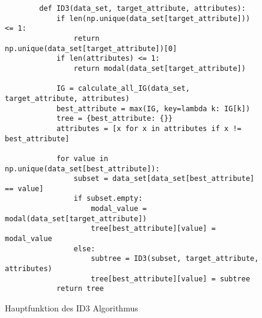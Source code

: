\begin{figure}[H]
    \centering
    \begin{verbatim}
        def ID3(data_set, target_attribute, attributes):
            if len(np.unique(data_set[target_attribute])) <= 1:
                return np.unique(data_set[target_attribute])[0]
            if len(attributes) <= 1:       
                return modal(data_set[target_attribute])

            IG = calculate_all_IG(data_set, target_attribute, attributes)
            best_attribute = max(IG, key=lambda k: IG[k])
            tree = {best_attribute: {}}
            attributes = [x for x in attributes if x != best_attribute]

            for value in np.unique(data_set[best_attribute]):
                subset = data_set[data_set[best_attribute] == value]
                if subset.empty:
                    modal_value = modal(data_set[target_attribute])
                    tree[best_attribute][value] = modal_value
                else:
                    subtree = ID3(subset, target_attribute, attributes)
                    tree[best_attribute][value] = subtree
            return tree
    \end{verbatim}
    \caption{Hauptfunktion des ID3 Algorithmus \autocites{MaxKeyByValue:online}{ID3algor15:online}{PythonCourseDecisionTrees:online}}
\end{figure}